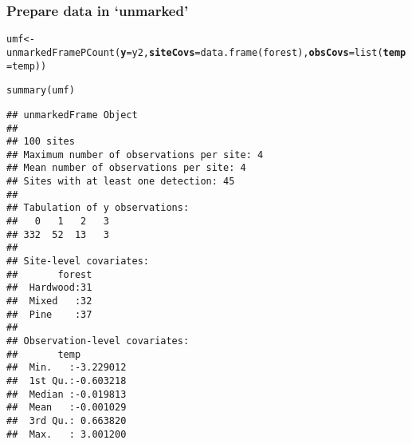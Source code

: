 \documentclass[color=usenames,dvipsnames]{beamer}\usepackage[]{graphicx}\usepackage[]{xcolor}
\makeatletter
\newcommand{\hldef}[1]{\textcolor[rgb]{0,0,0}{#1}}%
\newcommand{\hlkwb}[1]{\textcolor[rgb]{0,0.341,0.682}{#1}}%
\newcommand{\hlkwc}[1]{\textcolor[rgb]{0,0,0}{\textbf{#1}}}%
\newcommand{\hlkwd}[1]{\textcolor[rgb]{0.004,0.004,0.506}{#1}}%
\newenvironment{kframe}{%
 \def\at@end@of@kframe{}%
 \ifinner\ifhmode%
  \def\at@end@of@kframe{\end{minipage}}%
  \begin{minipage}{\columnwidth}%
 \fi\fi%
 \def\FrameCommand##1{\hskip\@totalleftmargin \hskip-\fboxsep
 \colorbox{shadecolor}{##1}\hskip-\fboxsep
     \hskip-\linewidth \hskip-\@totalleftmargin \hskip\columnwidth}%
 \MakeFramed {\advance\hsize-\width
   \@totalleftmargin\z@ \linewidth\hsize
   \@setminipage}}%
 {\par\unskip\endMakeFramed%
 \at@end@of@kframe}
\newenvironment{knitrout}{}{} %
\makeatother
\begin{document}
\begin{frame}[fragile]
  \frametitle{Prepare data in `unmarked'}
  \small
\begin{knitrout}\tiny
{}\color{fgcolor}\begin{kframe}
\begin{alltt}
\hldef{umf} \hlkwb{<-} \hlkwd{unmarkedFramePCount}\hldef{(}\hlkwc{y}\hldef{=y2,} \hlkwc{siteCovs}\hldef{=}\hlkwd{data.frame}\hldef{(forest),} \hlkwc{obsCovs}\hldef{=}\hlkwd{list}\hldef{(}\hlkwc{temp}\hldef{=temp))}
\end{alltt}
\end{kframe}
\end{knitrout}
\pause
\begin{knitrout}\tiny
{}\color{fgcolor}\begin{kframe}
\begin{alltt}
\hlkwd{summary}\hldef{(umf)}
\end{alltt}
\begin{verbatim}
## unmarkedFrame Object
## 
## 100 sites
## Maximum number of observations per site: 4 
## Mean number of observations per site: 4 
## Sites with at least one detection: 45 
## 
## Tabulation of y observations:
##   0   1   2   3 
## 332  52  13   3 
## 
## Site-level covariates:
##       forest  
##  Hardwood:31  
##  Mixed   :32  
##  Pine    :37  
## 
## Observation-level covariates:
##       temp          
##  Min.   :-3.229012  
##  1st Qu.:-0.603218  
##  Median :-0.019813  
##  Mean   :-0.001029  
##  3rd Qu.: 0.663820  
##  Max.   : 3.001200
\end{verbatim}
\end{kframe}
\end{knitrout}
\end{frame}
\end{document}
